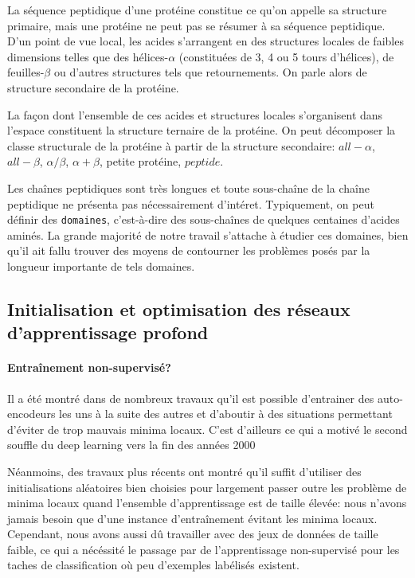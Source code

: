 \documentclass[a4paper, 11pt, onecolumn]{article}
\begin{document}
La séquence peptidique d'une protéine constitue ce qu'on appelle sa structure
primaire, mais une protéine ne peut pas se résumer à sa séquence peptidique.
D'un point de vue local, les acides s'arrangent en des structures locales de
faibles dimensions telles que des hélices-$\alpha$ (constituées de 3, 4 ou 5 tours
d'hélices), de feuilles-$\beta$ ou d'autres structures tels que retournements.
On parle alors de structure secondaire de la protéine.

La façon dont l'ensemble de ces acides et structures locales s'organisent dans
l'espace constituent la structure ternaire de la protéine. On peut décomposer la
classe structurale de la protéine à partir de la structure secondaire:
$all-\alpha$, $all-\beta$, $\alpha /\beta$, $\alpha + \beta$, petite protéine,
$peptide$.

Les chaînes peptidiques sont très longues et toute sous-chaîne de la chaîne
peptidique ne présenta pas nécessairement d'intéret. Typiquement, on peut
définir des \texttt{domaines}, c'est-à-dire des sous-chaînes de quelques
centaines d'acides aminés. La grande majorité de notre travail s'attache à
étudier ces domaines, bien qu'il ait fallu trouver des moyens de contourner les
problèmes posés par la longueur importante de tels domaines. 

\subsection{Initialisation et optimisation des réseaux d'apprentissage profond}

\paragraph{Entraînement non-supervisé?}

Il a été montré dans de nombreux travaux qu'il est possible d'entrainer des
auto-encodeurs les uns à la suite des autres et d'aboutir à des situations permettant
d'éviter de trop mauvais minima locaux. C'est d'ailleurs ce qui a motivé le
second souffle du deep learning vers la fin des années 2000

Néanmoins, des travaux plus récents ont montré qu'il suffit d'utiliser des
initialisations aléatoires bien choisies pour largement passer outre les problème
de minima locaux quand l'ensemble d'apprentissage est de taille élevée: nous n'avons jamais besoin que d'une instance d'entraînement
évitant les minima locaux. Cependant, nous avons aussi dû travailler avec des jeux de
données de taille faible, ce qui a nécéssité le passage par de l'apprentissage
non-supervisé pour les taches de classification où peu d'exemples labélisés existent.
\end{document}
